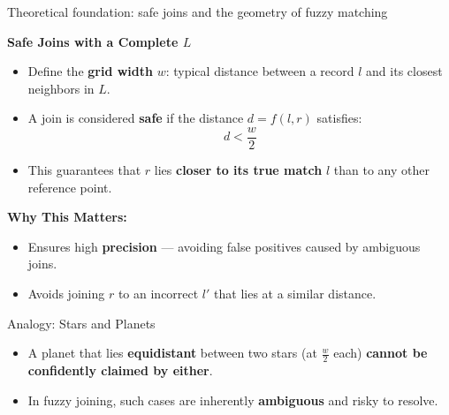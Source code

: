 \documentclass[8pt]{beamer} %
\begin{document}
\begin{frame}{Theoretical foundation: safe joins and the geometry of fuzzy matching}
	
	\textbf{Safe Joins with a Complete $L$}
	\begin{itemize}
		\item Define the \textbf{grid width} $w$: typical distance between a record $l$ and its closest neighbors in $L$.
		\item A join is considered \textbf{safe} if the distance $d = f(l, r)$ satisfies:
		$$
		d < \frac{w}{2}
		$$
		\item This guarantees that $r$ lies \textbf{closer to its true match} $l$ than to any other reference point.
	\end{itemize}
	
	\vspace{0.5em}
	\textbf{Why This Matters:}
	\begin{itemize}
		\item Ensures high \textbf{precision} — avoiding false positives caused by ambiguous joins.
		\item Avoids joining $r$ to an incorrect $l'$ that lies at a similar distance.
	\end{itemize}

	\vspace{0.5em}
	\begin{block}{Analogy: Stars and Planets}
		\begin{itemize}
			\item A planet that lies \textbf{equidistant} between two stars (at $\frac{w}{2}$ each) \textbf{cannot be confidently claimed by either}.
			\item In fuzzy joining, such cases are inherently \textbf{ambiguous} and risky to resolve.
		\end{itemize}
	\end{block}
\end{frame}
\end{document}
